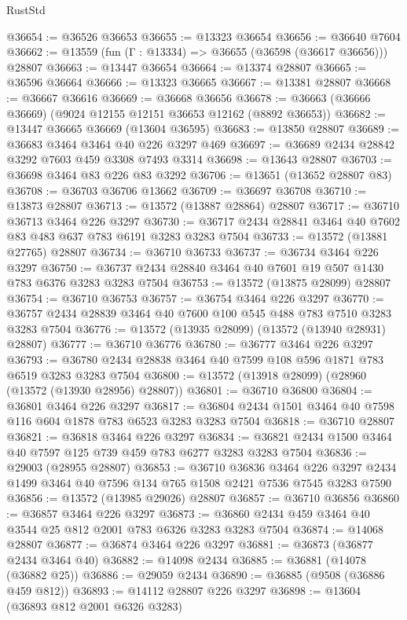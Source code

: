 \begin{lexlean}{RustStd}
\begin{coremodule}
@36654 := @36526 @36653
@36655 := @13323 @36654
@36656 := @36640 @7604
@36662 := @13559 (fun (Γ : @13334) => @36655 (@36598 (@36617 @36656))) @28807
@36663 := @13447 @36654
@36664 := @13374 @28807
@36665 := @36596 @36664
@36666 := @13323 @36665
@36667 := @13381 @28807
@36668 := @36667 @36616
@36669 := @36668 @36656
@36678 := @36663 (@36666 @36669) (@9024 @12155 @12151 @36653 @12162 (@8892 @36653))
@36682 := @13447 @36665 @36669 (@13604 @36595)
@36683 := @13850 @28807
@36689 := @36683 @3464 @3464 @40 @226 @3297 @469
@36697 := @36689 @2434 @28842 @3292 @7603 @459 @3308 @7493 @3314
@36698 := @13643 @28807
@36703 := @36698 @3464 @83 @226 @83 @3292
@36706 := @13651 (@13652 @28807 @83)
@36708 := @36703 @36706 @13662
@36709 := @36697 @36708
@36710 := @13873 @28807
@36713 := @13572 (@13887 @28864) @28807
@36717 := @36710 @36713 @3464 @226 @3297
@36730 := @36717 @2434 @28841 @3464 @40 @7602 @83 @483 @637 @783 @6191 @3283 @3283 @7504
@36733 := @13572 (@13881 @27765) @28807
@36734 := @36710 @36733
@36737 := @36734 @3464 @226 @3297
@36750 := @36737 @2434 @28840 @3464 @40 @7601 @19 @507 @1430 @783 @6376 @3283 @3283 @7504
@36753 := @13572 (@13875 @28099) @28807
@36754 := @36710 @36753
@36757 := @36754 @3464 @226 @3297
@36770 := @36757 @2434 @28839 @3464 @40 @7600 @100 @545 @488 @783 @7510 @3283 @3283 @7504
@36776 := @13572 (@13935 @28099) (@13572 (@13940 @28931) @28807)
@36777 := @36710 @36776
@36780 := @36777 @3464 @226 @3297
@36793 := @36780 @2434 @28838 @3464 @40 @7599 @108 @596 @1871 @783 @6519 @3283 @3283 @7504
@36800 := @13572 (@13918 @28099) (@28960 (@13572 (@13930 @28956) @28807))
@36801 := @36710 @36800
@36804 := @36801 @3464 @226 @3297
@36817 := @36804 @2434 @1501 @3464 @40 @7598 @116 @604 @1878 @783 @6523 @3283 @3283 @7504
@36818 := @36710 @28807
@36821 := @36818 @3464 @226 @3297
@36834 := @36821 @2434 @1500 @3464 @40 @7597 @125 @739 @459 @783 @6277 @3283 @3283 @7504
@36836 := @29003 (@28955 @28807)
@36853 := @36710
    @36836
    @3464
    @226
    @3297
    @2434
    @1499
    @3464
    @40
    @7596
    @134
    @765
    @1508
    @2421
    @7536
    @7545
    @3283
    @7590
@36856 := @13572 (@13985 @29026) @28807
@36857 := @36710 @36856
@36860 := @36857 @3464 @226 @3297
@36873 := @36860 @2434 @459 @3464 @40 @3544 @25 @812 @2001 @783 @6326 @3283 @3283 @7504
@36874 := @14068 @28807
@36877 := @36874 @3464 @226 @3297
@36881 := @36873 (@36877 @2434 @3464 @40)
@36882 := @14098 @2434
@36885 := @36881 (@14078 (@36882 @25))
@36886 := @29059 @2434
@36890 := @36885 (@9508 (@36886 @459 @812))
@36893 := @14112 @28807 @226 @3297
@36898 := @13604 (@36893 @812 @2001 @6326 @3283)

\end{coremodule}
\end{lexlean}
